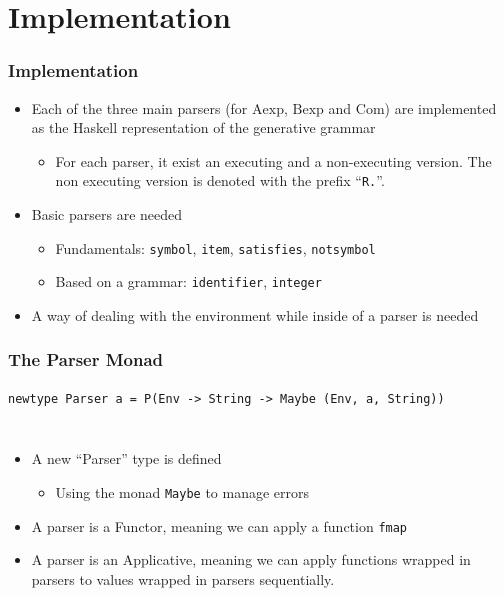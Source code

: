 \documentclass{beamer}
\begin{document}
\section{Implementation}
\begin{frame}
	\frametitle{Implementation}
	\begin{itemize}
		\item Each of the three main parsers (for $\mathrm{Aexp}$, $\mathrm{Bexp}$ and $\mathrm{Com}$) are
			implemented as the Haskell representation of the generative grammar
			\begin{itemize}
				\item For each parser, it exist an executing and a
					non-executing version. The non executing version is denoted
					with the prefix ``\texttt{R.}''.
			\end{itemize}
		\item Basic parsers are needed
		\begin{itemize}
			\item Fundamentals: \texttt{symbol}, \texttt{item},
				\texttt{satisfies}, \texttt{notsymbol}
			\item Based on a grammar: \texttt{identifier}, \texttt{integer}
		\end{itemize}
		\item A way of dealing with the environment while inside of a parser is needed
	\end{itemize}
\end{frame}

\begin{frame}
	\frametitle{The Parser Monad}
	\begin{center}
		\lstinline{newtype Parser a = P(Env -> String -> Maybe (Env, a, String))}
	\end{center}
	\begin{columns}
		\footnotesize
		\begin{itemize}
			\item A new ``Parser'' type is defined
				\begin{itemize}
					\footnotesize
					\item Using the monad \lstinline|Maybe| to manage errors
				\end{itemize}
			\item A parser is a Functor, meaning we can apply a function
				\texttt{fmap}
			\item A parser is an Applicative, meaning we can apply functions
				wrapped in parsers to values wrapped in parsers sequentially.
		\end{itemize}
		
		
	\end{columns}
\end{frame}
\end{document}
